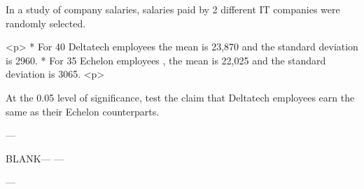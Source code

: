 


 In a study of company salaries, salaries paid by 2 different IT companies were randomly selected.
 
 <p> * For 40 Deltatech employees the mean is 23,870 and the standard deviation is 2960.
 * For 35 Echelon employees , the mean is 22,025 and the standard deviation is 3065.
 <p>
 
 At the 0.05 level of significance, test the claim that Deltatech employees earn the same as their  Echelon counterparts.
 
 

---

BLANK---
---

---